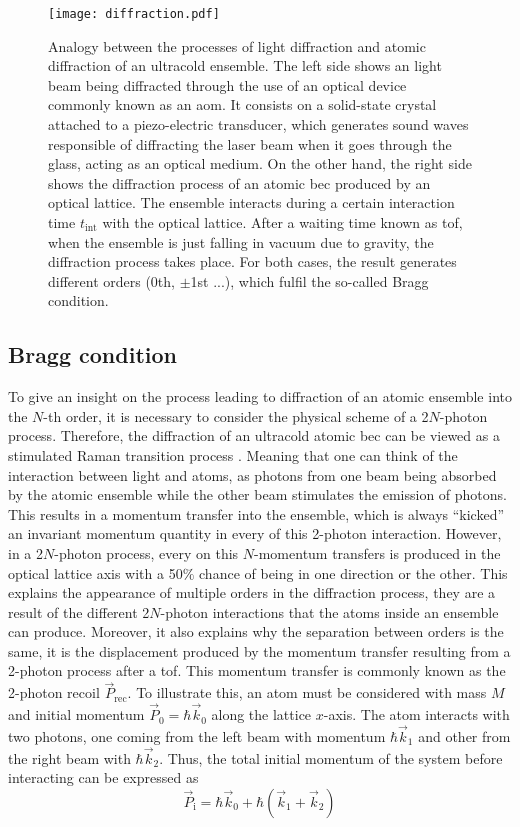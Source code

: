 \begin{figure}[!htbp]\centering
	\texttt{[image: diffraction.pdf]}
	\caption[Analogy between the processes of light diffraction and atomic diffraction of an ultracold ensemble]{Analogy between the processes of light diffraction and atomic diffraction of an ultracold ensemble. The left side shows an light beam being diffracted through the use of an optical device commonly known as an \Acf{aom}. It consists on a solid-state crystal attached to a piezo-electric transducer, which generates sound waves responsible of diffracting the laser beam when it goes through the glass, acting as an optical medium. On the other hand, the right side shows the diffraction process of an atomic \ac{bec} produced by an optical lattice. The ensemble interacts during a certain interaction time $t_{\text{int}}$ with the optical lattice. After a waiting time known as \Acf{tof}, when the ensemble is just falling in vacuum due to gravity, the diffraction process takes place. For both cases, the result generates different orders (0th, $\pm$1st ...), which fulfil the so-called Bragg condition.}\label{fig:diffraction}
\end{figure}


\subsection{Bragg condition}

To give an insight on the process leading to diffraction of an atomic ensemble into the $N$-th order, it is necessary to consider the physical scheme of a 2$N$-photon process. Therefore, the diffraction of an ultracold atomic \ac{bec} can be viewed as a stimulated Raman transition process \cite{Kozuma1999}. Meaning that one can think of the interaction between light and atoms, as photons from one beam being absorbed by the atomic ensemble while the other beam stimulates the emission of photons. This results in a momentum transfer into the ensemble, which is always ``kicked'' an invariant momentum quantity in every of this 2-photon interaction. However, in a 2$N$-photon process, every on this $N$-momentum transfers is produced in the optical lattice axis with a 50$\%$ chance of being in one direction or the other. This explains the appearance of multiple orders in the diffraction process, they are a result of the different 2$N$-photon interactions that the atoms inside an ensemble can produce. Moreover, it also explains why the separation between orders is the same, it is the displacement produced by the momentum transfer resulting from a 2-photon process after a \ac{tof}. This momentum transfer is commonly known as the 2-photon recoil $\vec{P}_\text{rec}$. To illustrate this, an atom must be considered with mass $M$ and initial momentum $\vec{P}_0 = \hbar \vec{k}_0$ along the lattice $x$-axis. The atom interacts with two photons, one coming from the left beam with momentum $\hbar \vec{k}_1$ and other from the right beam with $\hbar \vec{k}_2$. Thus, the total initial momentum of the system before interacting can be expressed as
\begin{equation}
	\vec{P}_\text{i} = \hbar \vec{k}_0 + \hbar (\vec{k}_1 + \vec{k}_2)
\end{equation}


